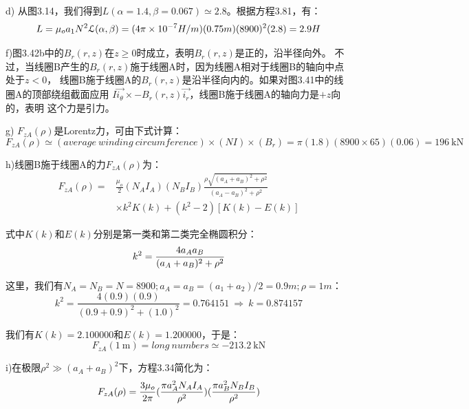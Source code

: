d) 从图3.14，我们得到$L(\alpha=1.4, \beta=0.067)\simeq 2.8$。根据方程3.81，有：
\begin{equation}
L=\mu_{o}a_{1}N^{2}\mathcal{L}(\alpha,\beta)\\%
=(4\pi\times 10^{-7}H/m)(0.75m)(8900)^{2}(2.8)=2.9H
\end{equation}

f)图3.42b中的$B_r(r, z)$在$z\ge 0$时成立，表明$B_r(r, z)$是正的，沿半径向外。
不过，当线圈B产生的$B_r(r, z)$施于线圈A时，因为线圈A相对于线圈B的轴向中点处于$z<0$，
线圈B施于线圈A的$B_r(r, z)$是沿半径向内的。如果对图3.41中的线圈A的顶部绕组截面应用
$I\vec{i_\theta}\times-B_r(r,z)\vec{i_r}$，线圈B施于线圈A的轴向力是$+z$向的，表明
这个力是引力。

g) $F_{zA}(\rho)$是Lorentz力，可由下式计算： 
\begin{equation}
F_{zA}(\rho)\simeq (average\ winding\ circumference)\times(NI)\times(B_r)=\pi(1.8)(8900\times 65)(0.06)=196\ \mathrm{kN}
\end{equation}

h)线圈B施于线圈A的力$F_{zA}(\rho)$为：
\begin{equation}
\begin{split}
F_{zA}(\rho)=&\frac{\mu_{o}}{2}(N_{A}I_{A})(N_{B}I_{B})\frac{\rho\sqrt{(a_{A}+a_{B})^{2}+\rho^{2}}}{(a_{A}-a_{B})^{2}+\rho^{2}}\\
&\times{k^{2}K(k)+(k^{2}-2)[K(k)-E(k)]}%
\end{split}
\end{equation}

式中$K(k)$和$E(k)$分别是第一类和第二类完全椭圆积分：
\begin{equation*}
k^{2}=\frac{4a_{A}a_{B}}{(a_{A}+a_{B})^{2}+\rho^{2}}\\%
\end{equation*}

这里，我们有$N_A=N_B=N =8900; a_A=a_B=(a_1+a_2)/2=0.9 m; \rho=1 m$：
\begin{equation*}
k^2=\frac{4(0.9)(0.9)}{(0.9+0.9)^2+(1.0)^2}=0.764151\ \Rightarrow\ k=0.874157 
\end{equation*}

我们有$K(k)=2.100000$和$E(k)=1.200000$，于是：
\begin{equation*}
F_{zA}(1\ \mathrm{m})=long\ numbers\simeq -213.2\ \mathrm{kN}
\end{equation*}


i)在极限$ρ^2\gg(a_A+a_B)^2$下，方程3.34简化为：
\begin{equation}
F_{zA}(\rho)=\frac{3\mu_{o}}{2\pi}(\frac{\pi a_{A}^{2}N_{A}I_{A}}{\rho^{2}})(\frac{\pi a_{B}^{2}N_{B}I_{B}}{\rho^{2}})\\%
\end{equation}

